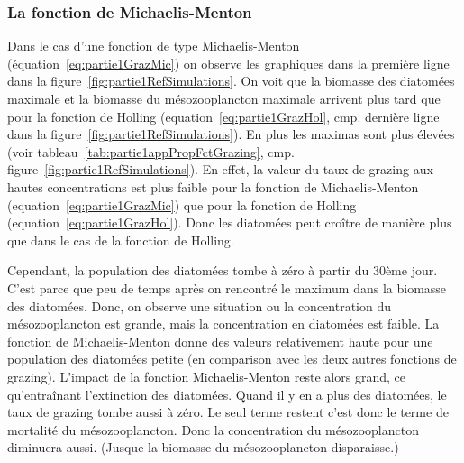 {\subsubsection{La fonction de Michaelis-Menton}
\par{
Dans le cas d'une fonction de type Michaelis-Menton (équation~\ref{eq:partie1GrazMic}) on observe les
graphiques dans la première ligne dans la figure~\ref{fig:partie1RefSimulations}. On voit que
la biomasse des diatomées maximale et la biomasse du mésozooplancton maximale arrivent plus tard que
pour la fonction de Holling (equation~\ref{eq:partie1GrazHol}, cmp. dernière ligne dans la
figure~\ref{fig:partie1RefSimulations}). En plus les maximas sont plus élevées (voir
tableau~\ref{tab:partie1appPropFctGrazing}, cmp. figure~\ref{fig:partie1RefSimulations}).
En effet, la valeur du taux de grazing aux hautes concentrations est plus faible pour la fonction de
Michaelis-Menton (equation~\ref{eq:partie1GrazMic}) que pour la fonction de Holling
(equation~\ref{eq:partie1GrazHol}). Donc les diatomées peut croître de manière plus que dans le cas de
la fonction de Holling.
}
\par{
Cependant, la population des diatomées tombe à zéro à partir du 30ème jour. C'est parce que peu de
temps après on rencontré le maximum dans la biomasse des diatomées. Donc, on observe une situation ou
la concentration du mésozooplancton est grande, mais la concentration en diatomées est faible.
La fonction de Michaelis-Menton donne des valeurs relativement haute pour une population des diatomées
petite (en comparison avec les deux autres fonctions de grazing). L'impact de la fonction Michaelis-Menton
reste alors grand, ce qu'entraînant l'extinction des diatomées. Quand il y en a plus des diatomées,
le taux de grazing tombe aussi à zéro. Le seul terme restent c'est donc le terme de mortalité du
mésozooplancton. Donc la concentration du mésozooplancton diminuera aussi. (Jusque la biomasse du
mésozooplancton disparaisse.)
}
}
